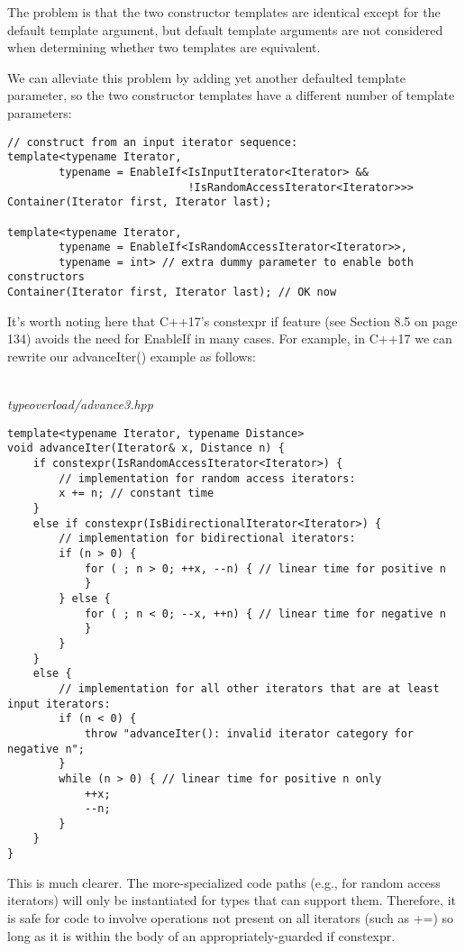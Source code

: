 The problem is that the two constructor templates are identical except for the default template argument, but default template arguments are not considered when determining whether two templates are equivalent.

We can alleviate this problem by adding yet another defaulted template parameter, so the two constructor templates have a different number of template parameters:

\begin{lstlisting}[style=styleCXX]
// construct from an input iterator sequence:
template<typename Iterator,
		typename = EnableIf<IsInputIterator<Iterator> &&
							!IsRandomAccessIterator<Iterator>>>
Container(Iterator first, Iterator last);

template<typename Iterator,
		typename = EnableIf<IsRandomAccessIterator<Iterator>>,
		typename = int> // extra dummy parameter to enable both constructors
Container(Iterator first, Iterator last); // OK now
\end{lstlisting}


It’s worth noting here that C++17’s constexpr if feature (see Section 8.5 on page 134) avoids the need for EnableIf in many cases. For example, in C++17 we can rewrite our advanceIter() example as follows:

\hspace*{\fill} \\ %
\noindent
\textit{typeoverload/advance3.hpp}
\begin{lstlisting}[style=styleCXX]
template<typename Iterator, typename Distance>
void advanceIter(Iterator& x, Distance n) {
	if constexpr(IsRandomAccessIterator<Iterator>) {
		// implementation for random access iterators:
		x += n; // constant time
	}
	else if constexpr(IsBidirectionalIterator<Iterator>) {
		// implementation for bidirectional iterators:
		if (n > 0) {
			for ( ; n > 0; ++x, --n) { // linear time for positive n
			}
		} else {
			for ( ; n < 0; --x, ++n) { // linear time for negative n
			}
		}
	}
	else {
		// implementation for all other iterators that are at least input iterators:
		if (n < 0) {
			throw "advanceIter(): invalid iterator category for negative n";
		}
		while (n > 0) { // linear time for positive n only
			++x;
			--n;
		}
	}
}
\end{lstlisting}

This is much clearer. The more-specialized code paths (e.g., for random access iterators) will only be instantiated for types that can support them. Therefore, it is safe for code to involve operations not present on all iterators (such as +=) so long as it is within the body of an appropriately-guarded if constexpr.

